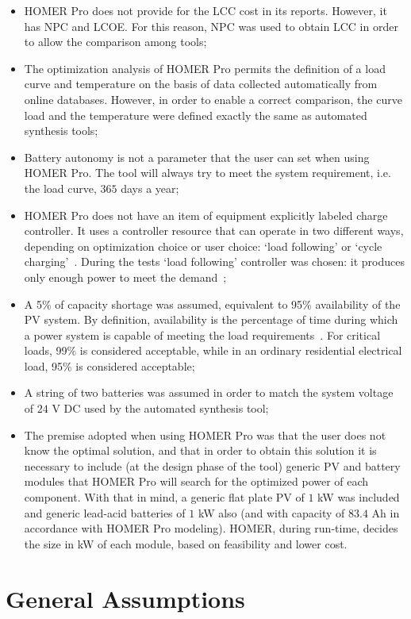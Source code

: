 \begin{itemize}
	\item HOMER Pro does not provide for the LCC cost in its reports. However, it has NPC and LCOE. For this reason, NPC was used to obtain LCC in order to allow the comparison among tools;
	\item The optimization analysis of HOMER Pro permits the definition of a load curve and temperature on the basis of data collected automatically from online databases. However, in order to enable a correct comparison, the curve load and the temperature were defined exactly the same as automated synthesis tools;
	\item Battery autonomy is not a parameter that the user can set when using HOMER Pro. The tool will always try to meet the system requirement, i.e. the load curve, $365$ days a year;
	\item HOMER Pro does not have an item of equipment explicitly labeled charge controller. It uses a controller resource that can operate in two different ways, depending on optimization choice or user choice: `load following' or `cycle charging'~\cite{HOMER}. During the tests  `load following' controller was chosen: it produces only enough power to meet the demand~\cite{HOMER};
	\item A 5\% of capacity shortage was assumed, equivalent to 95\%  availability of the PV system. By definition, availability is the percentage of time during which a power system is capable of meeting the load requirements~\cite{Khatib2014}. For critical loads, 99\% is considered acceptable, while in an ordinary residential electrical load, 95\% is considered acceptable;
	\item A string of two batteries was assumed in order to match the system voltage of $24$ V DC used by the automated synthesis tool;
	\item The premise adopted when using HOMER Pro was that the user does not know the optimal solution, and that in order to obtain this solution it is necessary to include (at the design phase of the tool) generic PV and battery modules that HOMER Pro will search for the optimized power of each component. With that in mind, a generic flat plate PV of $1$ kW was included and generic lead-acid batteries of $1$ kW also (and with capacity of $83.4$ Ah in accordance with HOMER Pro modeling). HOMER, during run-time, decides the size in kW of each module, based on feasibility and lower cost.	
\end{itemize}

\section{General Assumptions}

